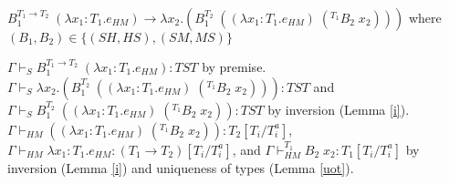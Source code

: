 \begin{case}
$B_{1}^{T_{1}\rightarrow T_{2}}\;(\lambda x_{1}:T_{1}.e_{HM})\rightarrow\lambda x_{2}.(B_{1}^{T_{2}}\;((\lambda x_{1}:T_{1}.e_{HM})\;(^{T_{1}}B_{2}\;x_{2})))$ where $(B_{1},B_{2})\in\lbrace(SH,HS),(SM,MS)\rbrace$

$\Gamma\vdash_{S}B_{1}^{T_{1}\rightarrow T_{2}}\;(\lambda x_{1}:T_{1}.e_{HM}):TST$ by premise.  $\Gamma\vdash_{S}\lambda x_{2}.(B_{1}^{T_{2}}\;((\lambda x_{1}:T_{1}.e_{HM})\;(^{T_{1}}B_{2}\;x_{2}))):TST$ and $\Gamma\vdash_{S}B_{1}^{T_{2}}\;((\lambda x_{1}:T_{1}.e_{HM})\;(^{T_{1}}B_{2}\;x_{2})):TST$ by inversion (Lemma \ref{i}).  $\Gamma\vdash_{HM}((\lambda x_{1}:T_{1}.e_{HM})\;(^{T_{1}}B_{2}\;x_{2})):T_{2}[T_{i}/T_{i}^{a}]$, $\Gamma\vdash_{HM}\lambda x_{1}:T_{1}.e_{HM}:(T_{1}\rightarrow T_{2})[T_{i}/T_{i}^{a}]$, and $\Gamma\vdash_{HM}^{T_{1}}B_{2}\;x_{2}:T_{1}[T_{i}/T_{i}^{a}]$ by inversion (Lemma \ref{i}) and uniqueness of types (Lemma \ref{uot}).
\end{case}